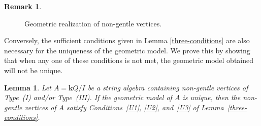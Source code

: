 \documentclass[11pt]{amsart}
\numberwithin{equation}{section}
\newtheorem{lemma}[theorem]{Lemma}
\theoremstyle{definition}
\newtheorem{remark}[theorem]{Remark}
\begin{document}
\begin{remark}
\begin{figure}[htbp]
\begin{center}
		
	\end{center}
	\caption{Geometric realization of non-gentle vertices.}
	\label{type II}
\end{figure}
\end{remark}

Conversely, the sufficient conditions given in Lemma \ref{three-conditions} are also necessary for the uniqueness of the geometric model. We prove this by showing that when any one of these conditions is not met, the geometric model obtained will not be unique.



\begin{lemma}\label{reverse of three conditions}
Let \(A=\mathbf{k}Q/I\) be a string algebra containing non-gentle
vertices of Type~\textup{(I)} and/or Type~\textup{(III)}. If the
geometric model of \(A\) is unique, then the non-gentle vertices of
\(A\) satisfy Conditions~\ref{U1}, \ref{U2}, and~\ref{U3} of
Lemma~\ref{three-conditions}.
\end{lemma}
\end{document}

